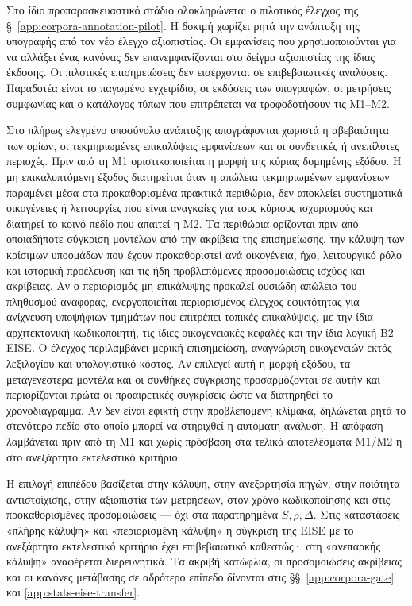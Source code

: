 \documentclass[11pt,a4paper]{article}
\begin{document}
Στο ίδιο προπαρασκευαστικό στάδιο ολοκληρώνεται ο πιλοτικός έλεγχος της §~\ref{app:corpora-annotation-pilot}. Η δοκιμή χωρίζει ρητά την ανάπτυξη της υπογραφής από τον νέο έλεγχο αξιοπιστίας. Οι εμφανίσεις που χρησιμοποιούνται για να αλλάξει ένας κανόνας δεν επανεμφανίζονται στο δείγμα αξιοπιστίας της ίδιας έκδοσης. Οι πιλοτικές επισημειώσεις δεν εισέρχονται σε επιβεβαιωτικές αναλύσεις. Παραδοτέα είναι το παγωμένο εγχειρίδιο, οι εκδόσεις των υπογραφών, οι μετρήσεις συμφωνίας και ο κατάλογος τύπων που επιτρέπεται να τροφοδοτήσουν τις M1--M2.

Στο πλήρως ελεγμένο υποσύνολο ανάπτυξης απογράφονται χωριστά η αβεβαιότητα των ορίων, οι τεκμηριωμένες επικαλύψεις εμφανίσεων και οι συνδετικές ή ανεπίλυτες περιοχές. Πριν από τη M1 οριστικοποιείται η μορφή της κύριας δομημένης εξόδου. Η μη επικαλυπτόμενη έξοδος διατηρείται όταν η απώλεια τεκμηριωμένων εμφανίσεων παραμένει μέσα στα προκαθορισμένα πρακτικά περιθώρια, δεν αποκλείει συστηματικά οικογένειες ή λειτουργίες που είναι αναγκαίες για τους κύριους ισχυρισμούς και διατηρεί το κοινό πεδίο που απαιτεί η M2. Τα περιθώρια ορίζονται πριν από οποιαδήποτε σύγκριση μοντέλων από την ακρίβεια της επισημείωσης, την κάλυψη των κρίσιμων υποομάδων που έχουν προκαθοριστεί ανά οικογένεια, ήχο, λειτουργικό ρόλο και ιστορική προέλευση και τις ήδη προβλεπόμενες προσομοιώσεις ισχύος και ακρίβειας. Αν ο περιορισμός μη επικάλυψης προκαλεί ουσιώδη απώλεια του πληθυσμού αναφοράς, ενεργοποιείται περιορισμένος έλεγχος εφικτότητας για ανίχνευση υποψήφιων τμημάτων που επιτρέπει τοπικές επικαλύψεις, με την ίδια αρχιτεκτονική κωδικοποιητή, τις ίδιες οικογενειακές κεφαλές και την ίδια λογική B2--EISE. Ο έλεγχος περιλαμβάνει μερική επισημείωση, αναγνώριση οικογενειών εκτός λεξιλογίου και υπολογιστικό κόστος. Αν επιλεγεί αυτή η μορφή εξόδου, τα μεταγενέστερα μοντέλα και οι συνθήκες σύγκρισης προσαρμόζονται σε αυτήν και περιορίζονται πρώτα οι προαιρετικές συγκρίσεις ώστε να διατηρηθεί το χρονοδιάγραμμα. Αν δεν είναι εφικτή στην προβλεπόμενη κλίμακα, δηλώνεται ρητά το στενότερο πεδίο στο οποίο μπορεί να στηριχθεί η αυτόματη ανάλυση. Η απόφαση λαμβάνεται πριν από τη M1 και χωρίς πρόσβαση στα τελικά αποτελέσματα M1/M2 ή στο ανεξάρτητο εκτελεστικό κριτήριο.

Η επιλογή επιπέδου βασίζεται στην κάλυψη, στην ανεξαρτησία πηγών, στην ποιότητα αντιστοίχισης, στην αξιοπιστία των μετρήσεων, στον χρόνο κωδικοποίησης και στις προκαθορισμένες προσομοιώσεις --- όχι στα παρατηρημένα \(S,\rho,\Delta\). Στις καταστάσεις «πλήρης κάλυψη» και «περιορισμένη κάλυψη» η σύγκριση της EISE με το ανεξάρτητο εκτελεστικό κριτήριο έχει επιβεβαιωτικό καθεστώς· στη «ανεπαρκής κάλυψη» αναφέρεται διερευνητικά. Τα ακριβή κατώφλια, οι προσομοιώσεις ακρίβειας και οι κανόνες μετάβασης σε αδρότερο επίπεδο δίνονται στις §§~\ref{app:corpora-gate} και \ref{app:stats-eise-transfer}.
\end{document}
